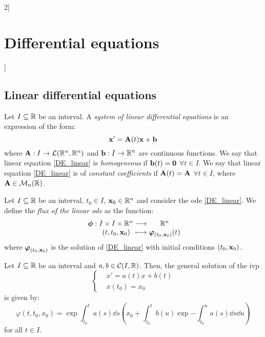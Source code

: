 \documentclass[../../../main.tex]{subfiles}
\begin{document}
\begin{multicols}{2}[\section{Differential equations}]
  \subsection{Linear differential equations}
  \begin{definition}
    Let $I\subseteq\mathbb{R}$ be an interval. A \textit{system of linear differential equations} is an expression of the form:
    \begin{equation}\label{DE_linear}
      \boldsymbol{\mathrm{x}}'=\boldsymbol{\mathrm{A}}(t)\boldsymbol{\mathrm{x}}+\boldsymbol{\mathrm{b}}
    \end{equation}
    where $\boldsymbol{\mathrm{A}}:I\rightarrow\mathcal{L}(\mathbb{R}^n,\mathbb{R}^n)$ and $\boldsymbol{\mathrm{b}}:I\rightarrow\mathbb{R}^n$ are continuous functions.
    We say that linear equation \eqref{DE_linear} is \textit{homogeneous} if $\boldsymbol{\mathrm{b}}(t)=\boldsymbol{\mathrm{0}}$ $\forall t\in I$. We say that linear equation \eqref{DE_linear} is of \textit{constant coefficients} if $\boldsymbol{\mathrm{A}}(t)=\boldsymbol{\mathrm{A}}$ $\forall t\in I$, where $\boldsymbol{\mathrm{A}}\in\mathcal{M}_n(\mathbb{R})$.
  \end{definition}
  \begin{definition}
    Let $I\subseteq\mathbb{R}$ be an interval, $t_0\in I$, $\boldsymbol{\mathrm{x}}_0\in\mathbb{R}^n$ and consider the ode \eqref{DE_linear}. We define the \textit{flux of the linear ode} as the function:
    $$
      \function{\vectorfunction{\phi}}{I\times I\times \RR^n}{\RR^n}{(t,t_0,\vectorfunction{x}_0)}{\vectorfunction{\varphi}_{(t_0,\vectorfunction{x}_0)}(t)}
    $$
    where $\boldsymbol{\mathrm{\varphi}}_{(t_0,\boldsymbol{\mathrm{x}}_0)}$ is the solution of \eqref{DE_linear} with initial conditions $(t_0,\boldsymbol{\mathrm{x}}_0)$.
  \end{definition}
  \begin{prop}
    Let $I\subseteq\mathbb{R}$ be an interval and $a,b\in\mathcal{C}(I,\mathbb{R})$. Then, the general solution of the ivp
    $$\left\{
      \begin{aligned}
         & x'      =a(t)x+b(t) \\
         & x(t_0)  =x_0
      \end{aligned}
      \right.$$
    is given by:
    \begin{equation}\label{DE_sol-lin}
      \varphi(t,t_0,x_0)=\exp{\int_{t_0}^ta(s)\dd s}\left(x_0+\int_{t_0}^tb(u)\exp{-\int_{t_0}^ua(s)\dd s}\dd u\right)
    \end{equation}
    for all $t\in I$.
  \end{prop}

\end{multicols}
\end{document}
